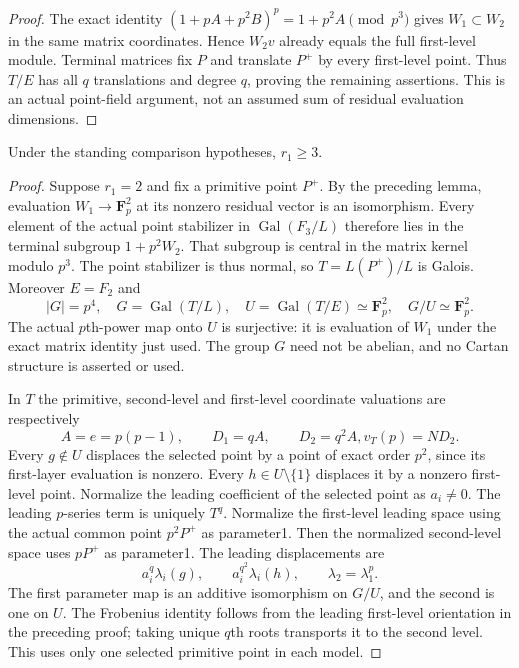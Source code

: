 \begin{proof}
The exact identity
$(1+pA+p^2B)^p=1+p^2A\pmod{p^3}$ gives $W_1\subset W_2$
in the same matrix coordinates. Hence $W_2v$ already equals the
full first-level module. Terminal matrices fix $P$ and translate
$P^+$ by every first-level point. Thus $T/E$ has all $q$
translations and degree $q$, proving the remaining assertions.
This is an actual point-field argument, not an assumed sum of
residual evaluation dimensions.
\end{proof}

\begin{proposition}
\label{prop:B-RD97-two}
Under the standing comparison hypotheses, $r_1\ge3$.
\end{proposition}
\begin{proof}
Suppose $r_1=2$ and fix a primitive point $P^+$. By the preceding
lemma, evaluation $W_1\longrightarrow\mathbf F_p^2$ at its
nonzero residual vector is an isomorphism. Every element of the
actual point stabilizer in $\operatorname{Gal}(F_3/L)$ therefore
lies in the terminal subgroup $1+p^2W_2$. That subgroup is central
in the matrix kernel modulo $p^3$. The point stabilizer is thus
normal, so $T=L(P^+)/L$ is Galois. Moreover $E=F_2$ and
\[
 |G|=p^4,\quad G=\operatorname{Gal}(T/L),\quad
 U=\operatorname{Gal}(T/E)\simeq\mathbf F_p^2,
 \quad G/U\simeq\mathbf F_p^2.                      \tag{B-RD97.5}
\]
The actual $p$th-power map onto $U$ is surjective: it is evaluation
of $W_1$ under the exact matrix identity just used. The group $G$
need not be abelian, and no Cartan structure is asserted or used.

In $T$ the primitive, second-level and first-level coordinate
valuations are respectively
\[
 A=e=p(p-1),\qquad D_1=qA,\qquad D_2=q^2A,
                      v_T(p)=ND_2.                  \tag{B-RD97.6}
\]
Every $g\notin U$ displaces the selected point by a point of exact
order $p^2$, since its first-layer evaluation is nonzero. Every
$h\in U\setminus\{1\}$ displaces it by a nonzero first-level
point. Normalize the leading coefficient of the selected point
as $a_i\ne0$. The leading $p$-series term is uniquely $T^q$.
Normalize the first-level leading space using the actual common
point $p^2P^+$ as parameter1. Then the normalized second-level
space uses $pP^+$ as parameter1. The leading displacements are
\[
 a_i^q\lambda_i(g),\qquad
 a_i^{q^2}\lambda_i(h),\qquad
                  \lambda_2=\lambda_1^p.             \tag{B-RD97.7}
\]
The first parameter map is an additive isomorphism on $G/U$,
and the second is one on $U$. The Frobenius identity follows
from the leading first-level orientation in the preceding proof;
taking unique $q$th roots transports it to the second level.
This uses only one selected primitive point in each model.


\end{proof}
